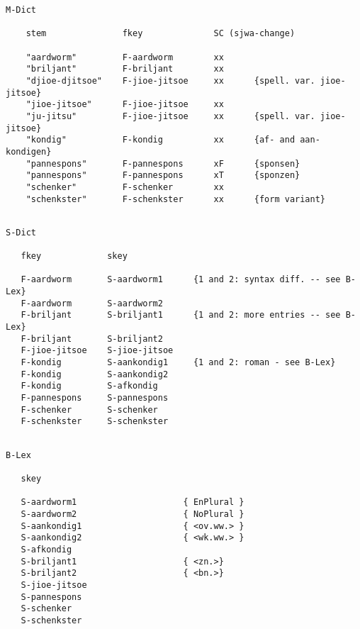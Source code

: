\begin{verbatim}
M-Dict
    
    stem               fkey              SC (sjwa-change)

    "aardworm"         F-aardworm        xx
    "briljant"         F-briljant        xx
    "djioe-djitsoe"    F-jioe-jitsoe     xx      {spell. var. jioe-jitsoe}
    "jioe-jitsoe"      F-jioe-jitsoe     xx
    "ju-jitsu"         F-jioe-jitsoe     xx      {spell. var. jioe-jitsoe}
    "kondig"           F-kondig          xx      {af- and aan-kondigen}
    "pannespons"       F-pannespons      xF      {sponsen}
    "pannespons"       F-pannespons      xT      {sponzen}
    "schenker"         F-schenker        xx
    "schenkster"       F-schenkster      xx      {form variant}
\end{verbatim}
\begin{verbatim}

S-Dict
    
   fkey             skey
    
   F-aardworm       S-aardworm1      {1 and 2: syntax diff. -- see B-Lex}
   F-aardworm       S-aardworm2
   F-briljant       S-briljant1      {1 and 2: more entries -- see B-Lex}
   F-briljant       S-briljant2
   F-jioe-jitsoe    S-jioe-jitsoe 
   F-kondig         S-aankondig1     {1 and 2: roman - see B-Lex}
   F-kondig         S-aankondig2
   F-kondig         S-afkondig
   F-pannespons     S-pannespons
   F-schenker       S-schenker
   F-schenkster     S-schenkster
\end{verbatim}
\begin{verbatim}

B-Lex
    
   skey
    
   S-aardworm1                     { EnPlural }
   S-aardworm2                     { NoPlural }
   S-aankondig1                    { <ov.ww.> }
   S-aankondig2                    { <wk.ww.> }
   S-afkondig
   S-briljant1                     { <zn.>}
   S-briljant2                     { <bn.>}
   S-jioe-jitsoe
   S-pannespons
   S-schenker
   S-schenkster
\end{verbatim}
